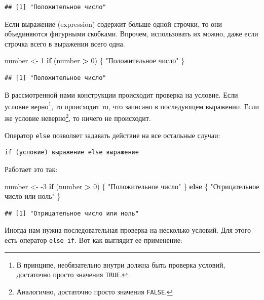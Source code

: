 \documentclass[
]{book}
\newenvironment{Shaded}{\begin{snugshade}}{\end{snugshade}}
\newcommand{\ControlFlowTok}[1]{\textcolor[rgb]{0.13,0.29,0.53}{\textbf{#1}}}
\newcommand{\DecValTok}[1]{\textcolor[rgb]{0.00,0.00,0.81}{#1}}
\newcommand{\NormalTok}[1]{#1}
\newcommand{\OperatorTok}[1]{\textcolor[rgb]{0.81,0.36,0.00}{\textbf{#1}}}
\newcommand{\StringTok}[1]{\textcolor[rgb]{0.31,0.60,0.02}{#1}}
\begin{document}
\begin{verbatim}
## [1] "Положительное число"
\end{verbatim}

Если выражение (expression) содержит больше одной строчки, то они объединяются фигурными скобками. Впрочем, использовать их можно, даже если строчка всего в выражении всего одна.

\begin{Shaded}
\begin{Highlighting}[]
\NormalTok{number <-}\StringTok{ }\DecValTok{1}
\ControlFlowTok{if}\NormalTok{ (number }\OperatorTok{>}\StringTok{ }\DecValTok{0}\NormalTok{) \{}
  \StringTok{"Положительное число"}
\NormalTok{\}}
\end{Highlighting}
\end{Shaded}

\begin{verbatim}
## [1] "Положительное число"
\end{verbatim}

В рассмотренной нами конструкции происходит проверка на условие. Если условие верно\footnote{В принципе, необязательно внутри должна быть проверка условий, достаточно просто значения \texttt{TRUE}.}, то происходит то, что записано в последующем выражении. Если же условие неверно\footnote{Аналогично, достаточно просто значения \texttt{FALSE}.}, то ничего не происходит.

Оператор \texttt{else} позволяет задавать действие на все остальные случаи:

\begin{verbatim}
if (условие) выражение else выражение
\end{verbatim}

Работает это так:

\begin{Shaded}
\begin{Highlighting}[]
\NormalTok{number <-}\StringTok{ }\DecValTok{-3}
\ControlFlowTok{if}\NormalTok{ (number }\OperatorTok{>}\StringTok{ }\DecValTok{0}\NormalTok{) \{}
  \StringTok{"Положительное число"}
\NormalTok{\} }\ControlFlowTok{else}\NormalTok{ \{}
  \StringTok{"Отрицательное число или ноль"}
\NormalTok{\}}
\end{Highlighting}
\end{Shaded}

\begin{verbatim}
## [1] "Отрицательное число или ноль"
\end{verbatim}

Иногда нам нужна последовательная проверка на несколько условий. Для этого есть оператор \texttt{else\ if}. Вот как выглядит ее применение:
\end{document}
